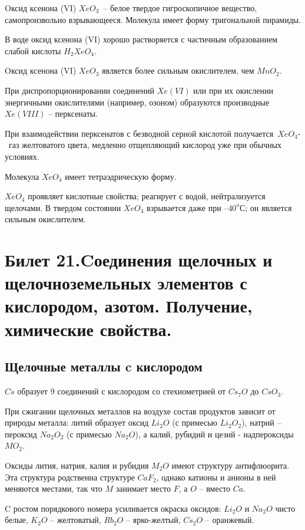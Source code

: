 \documentclass[11pt]{article}
\begin{document}
Oксид ксенона (VI) $XeO_3$ – белое твердое гигроскопичное вещество, самопроизвольно взрывающееся. Молекула имеет форму тригональной пирамиды.

В воде оксид ксенона (VI) хорошо растворяется с частичным образованием слабой кислоты $H_2XeO_4$.

Oксид ксенона (VI) $XeO_3$ является более сильным окислителем, чем $MnO_2$.

При диспропорционировании соединений $Xe (VI)$ или при их окислении энергичными окислителями (например, озоном) образуются производные $Xe (VIII)$ – перксенаты.

При взаимодействии перксенатов с безводной серной кислотой получается $XeO_4$- газ желтоватого цвета, медленно отщепляющий кислород уже при обычных условиях.

Молекула $XeO_4$ имеет тетраэдрическую форму.

$XeO_4$ проявляет кислотные свойства; реагирует с водой, нейтрализуется щелочами. В твердом состоянии $XeO_4$ взрывается даже при $–40 ^o С$; он является сильным окислителем.



\section{Билет 21.Cоединения щелочных и щелочноземельных элементов с кислородом, азотом. Получение, химические свойства.}

\subsection{Щелочные металлы c кислородом}

$Cs$ образует 9 соединений с кислородом со стехиометрией от $Cs_7O$ до $CsO_3$.

При сжигании щелочных металлов на воздухе состав продуктов зависит от
природы металла: литий образует оксид $Li_2O$ (с примесью $Li_2O_2$), натрий – пероксид
$Na_2O_2$ (с примесью $Na_2O$), а калий, рубидий и цезий - надпероксиды $MO_2$.

Oксиды лития, натрия, калия и рубидия $M_2O$ имеют структуру антифлюорита. Эта
структура родственна структуре $CaF_2$, однако катионы и анионы в ней меняются местами,
так что $M$ занимает место $F$, а $O$ – вместо $Ca$.

C ростом порядкового номера усиливается окраска оксидов: $Li_2O$ и $Na_2O$ чисто
белые, $K_2O$ – желтоватый, $Rb_2O$ – ярко-желтый, $Cs_2O$ – оранжевый.
\end{document}
